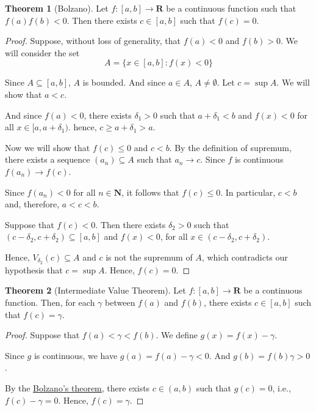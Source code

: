 \documentclass[tikz,12pt,a4paper]{article}
\theoremstyle{definition}
\newtheorem{theorem}{Theorem}[section]
\begin{document}
\begin{theorem}[Bolzano]\label{thm:bolzano-cont-fun}
	Let $f : [a,b] \longrightarrow \textbf{R}$ be a continuous function such that $f(a)f(b)<0$. Then there exists $c \in [a,b]$ such that $f(c) = 0$.
\end{theorem}

\begin{proof}
	Suppose, without loss of generality, that $f(a) < 0$ and $f(b) > 0$. We will consider the set \[ A = \{x \in [a,b] : f(x) < 0\} \]
	
	Since $A \subseteq [a,b]$, $A$ is bounded. And since $a \in A$, $A \neq \emptyset$. Let $c = \sup A$. We will show that $a < c$.
	
	And since $f(a) < 0$, there exists $\delta_1 > 0$ such that $a + \delta_1 < b$ and $f(x) < 0$ for all $x \in [a, a+\delta_1)$. hence, $c \geq a+\delta_1 > a$.
	
	Now we will show that $f(c) \leq 0$ and $c < b$. By the definition of supremum, there exists a sequence $(a_n) \subseteq A$ such that $a_n \longrightarrow c$. Since $f$ is continuous $f(a_n) \longrightarrow f(c)$. 
	
	Since $f(a_n) < 0$ for all $n \in \textbf{N}$, it follows that $f(c) \leq 0$. In particular, $c<b$ and, therefore, $a < c < b$.
	
	Suppose that $f(c) < 0$. Then there exists $\delta_2 > 0$ such that $(c - \delta_2, c+\delta_2) \subseteq [a,b]$ and $f(x) < 0$, for all $x \in (c - \delta_2, c+\delta_2)$.
	
	Hence, $V_{\delta_2}(c) \subseteq A$ and $c$ is not the supremum of $A$, which contradicts our hypothesis that $c = \sup A$. Hence, $f(c) = 0$.
\end{proof}

\begin{theorem}[Intermediate Value Theorem]\label{thm:IVT}
	Let $f:[a,b] \longrightarrow \textbf{R}$ be a continuous function. Then, for each $\gamma$ between $f(a)$ and $f(b)$, there exists $c \in [a,b]$ such that $f(c) = \gamma$.
\end{theorem}

\begin{proof}
	Suppose that $f(a) < \gamma < f(b)$. We define $g(x) = f(x) - \gamma$.
	
	Since $g$ is continuous, we have $g(a) = f(a) - \gamma < 0$. And $g(b) = f(b) \gamma > 0$.
	
	By the \hyperref[thm:bolzano-cont-fun]{Bolzano's theorem}, there exists $c \in (a,b)$ such that $g(c) = 0$, i.e., $f(c) - \gamma = 0$. Hence, $f(c) = \gamma$.
\end{proof}
\end{document}
